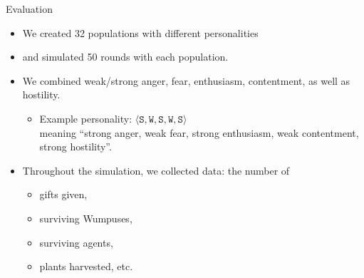 \documentclass{beamer}
\newcommand{\tuple}[1]{\ensuremath{\langle #1 \rangle}}
\newcommand{\type}[1]{\mathtt{#1}}
\newcommand{\personality}[5]{\tuple{\type{#1},\type{#2}, \type{#3}, \type{#4}, \type{#5}}}
\begin{document}
   \begin{frame}{Evaluation}
      \begin{itemize}
         \item We created 32 populations with different personalities
         \item and simulated 50 rounds with each population.
         \item We combined weak/strong anger, fear, enthusiasm, contentment, as well as hostility.
            \begin{itemize}
               \item Example personality: $\personality{S}{W}{S}{W}{S}$\\
               meaning ``strong anger, weak fear, strong enthusiasm, weak contentment, strong hostility''.
            \end{itemize}
         \item Throughout the simulation, we collected data: the number of
         \begin{itemize}
            \item gifts given,
            \item surviving Wumpuses,
            \item surviving agents,
            \item plants harvested, etc.
         \end{itemize}
      \end{itemize}
   \end{frame}
   
\end{document}
